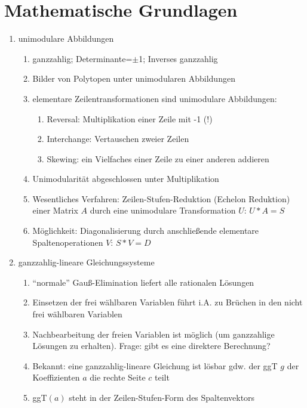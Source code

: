 \setcounter{section}{2}
\section{Mathematische Grundlagen}
\label{sec:math:i}

\begin{enumerate}
\item unimodulare Abbildungen 
  \begin{enumerate}
  \item ganzzahlig; Determinante=$\pm$1; Inverses ganzzahlig
  \item Bilder von Polytopen unter unimodularen Abbildungen
  \item elementare Zeilentransformationen sind unimodulare Abbildungen:
    \begin{enumerate}
    \item Reversal: Multiplikation einer Zeile mit -1 (!)
    \item Interchange: Vertauschen zweier Zeilen
    \item Skewing: ein Vielfaches einer Zeile zu einer anderen addieren
    \end{enumerate}
  \item Unimodularität abgeschlossen unter Multiplikation
  \item Wesentliches Verfahren: Zeilen-Stufen-Reduktion (Echelon
    Reduktion) einer Matrix $A$ durch eine unimodulare Transformation
    $U$: $U*A = S$
  \item Möglichkeit: Diagonalisierung durch anschließende elementare
    Spaltenoperationen $V$: $S*V = D$
  \end{enumerate}
\item ganzzahlig-lineare Gleichungssysteme
  \begin{enumerate}
  \item ``normale'' Gauß-Elimination liefert alle rationalen Lösungen
  \item Einsetzen der frei wählbaren Variablen führt i.A. zu Brüchen in
    den nicht frei wählbaren Variablen
  \item Nachbearbeitung der freien Variablen ist möglich (um
    ganzzahlige Lösungen zu erhalten). Frage: gibt es eine direktere
    Berechnung?  
  \item Bekannt: eine ganzzahlig-lineare Gleichung ist lösbar gdw. der
    ggT $g$ der Koeffizienten $a$ die rechte Seite $c$ teilt
  \item ggT$(a)$ steht in der Zeilen-Stufen-Form des Spaltenvektors

\end{enumerate}
\end{enumerate}
